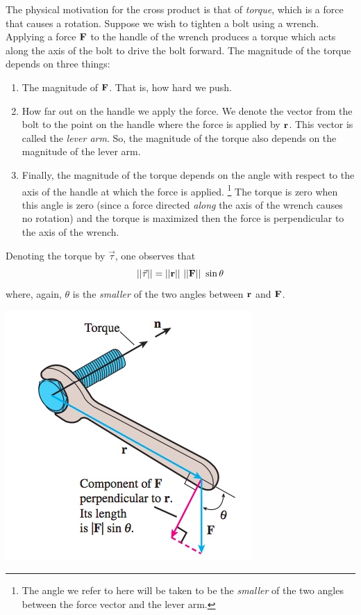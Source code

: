 \documentclass[12pt,letterpaper,reqno]{article}
\numberwithin{equation}{section}
\newcommand{\ti}[1]{\textit{#1}}
\begin{document}
The physical motivation for the cross product is that of \ti{torque}, which is a force that causes a rotation. Suppose we wish to tighten a bolt using a wrench. Applying a force ${\bf F}$ to the handle of the wrench produces a torque which acts along the axis of the bolt to drive the bolt forward. The magnitude of the torque depends on three things:
\begin{enumerate}
	\item The magnitude of ${\bf F}$. That is, how hard we push.
	\item How far out on the handle we apply the force. We denote the vector from the bolt to the point on the handle where the force is applied by ${\bf r}$. This vector is called the \ti{lever arm}. So, the magnitude of the torque also depends on the magnitude of the lever arm.
	\item Finally, the magnitude of the torque depends on the angle with respect to the axis of the handle at which the force is applied. \footnote{The angle we refer to here will be taken to be the \ti{smaller} of the two angles between the force vector and the lever arm.} The torque is zero when this angle is zero (since a force directed \ti{along} the axis of the wrench causes no rotation) and the torque is maximized then the force is perpendicular to the axis of the wrench.
\end{enumerate}
Denoting the torque by $\vec{\tau}$, one observes that 
\begin{equation}\label{eq:magnitude_of_torque}
	||\vec{\tau}||=||{\bf r}||\ ||{\bf F}||\ \sin \theta
\end{equation}
where, again, $\theta$ is the \ti{smaller} of the two angles between ${\bf r}$ and ${\bf F}$.
\begin{center}
	\includegraphics[scale=0.5]{figures_mvc/torque_wrench}
\end{center}
\end{document}
